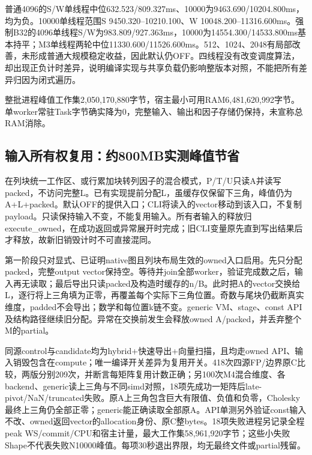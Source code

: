 \documentclass[UTF8,a4paper,11pt]{ctexart}
\begin{document}
普通4096的S/W单线程中位632.523/809.327ms、10000为9463.690/10204.800ms，均为负。10000单线程范围S 9450.320--10210.100、W 10048.200--11316.600ms。强制B32的4096单线程S/W为983.809/927.363ms，10000为14554.300/14533.800ms基本持平；M3单线程两轮中位11330.600/11526.600ms。512、1024、2048有局部改善，未形成普通大规模稳定收益，因此默认仍OFF。四线程没有改变调度算法，却出现正负计时差异，说明编译实现与共享负载仍影响整版本对照，不能把所有差异归因为闭式遍历。

整批进程峰值工作集2,050,170,880字节，宿主最小可用RAM6,481,620,992字节。单worker常驻Task字节确实降为0，完整输入、输出和因子存储仍保持，未宣称总RAM消除。

\subsection{输入所有权复用：约800MB实测峰值节省}
在列块统一工作区、或行累加块转列因子的混合模式，P/T/U只读A并读写packed，不访问完整L。已有实现提前分配L，虽缓存仅保留下三角，峰值仍为A+L+packed。默认OFF的提供入口；CLI将读入的vector移动到该入口，不复制payload。只读保持输入不变，不能复用输入。所有者输入的释放归execute\_owned，在成功返回或异常展开时完成；旧CLI变量原先直到写出结果后才释放，故新旧销毁计时不可直接混同。

第一阶段只对显式、已证明native图且列块布局生效的owned入口启用。先只分配packed，完整output vector保持空。等待并join全部worker，验证完成数之后，输入再无读取；最后导出只读packed及构造时缓存的n/B。此时把A的vector交换给L，逐行将上三角填为正零，再覆盖每个实际下三角位置。奇数与尾块仍截断真实维度，padded不会导出；数学和每位置k链不变。generic VM、stage、const API及结构路径继续旧分配。异常在交换前发生会释放owned A/packed，并丢弃整个M的partial。

同源control与candidate均为hybrid+快速导出+向量扫描，且均走owned API、输入销毁包含在compute；唯一编译开关差异为复用开关。418次四源FP/边界原C比较，两版分别209次，并断言每矩阵复用计数正确；另100次M4混合维度、各backend、generic读上三角与不同simd对照，18项先成功一矩阵后late-pivot/NaN/truncated失败。原A上三角包含巨大有限值、负值和负零，Cholesky最终上三角仍全部正零；generic能正确读取全部原A。API单测另外验证const输入不改、owned返回vector的allocation身份、原C整bytes。18项失败进程另记录全程peak WS/commit/CPU和宿主计量，最大工作集58,961,920字节；这些小失败Shape不代表失败N10000峰值。每项30秒退出界限，均无最终文件或partial残留。
\end{document}
